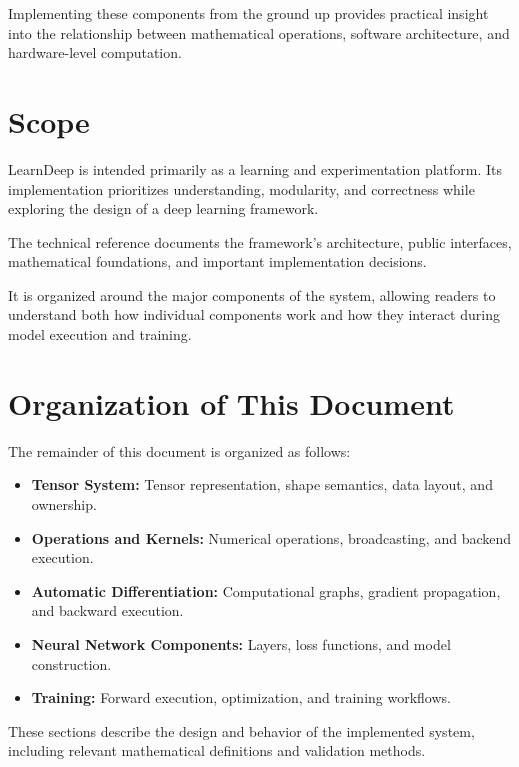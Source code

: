Implementing these components from the ground up
provides practical insight into the relationship
between mathematical operations, software
architecture, and hardware-level computation.

\section{Scope}

LearnDeep is intended primarily as a learning and
experimentation platform. Its implementation
prioritizes understanding, modularity, and correctness
while exploring the design of a deep learning framework.

The technical reference documents the framework's
architecture, public interfaces, mathematical
foundations, and important implementation decisions.

It is organized around the major components of the
system, allowing readers to understand both how
individual components work and how they interact
during model execution and training.

\section{Organization of This Document}

The remainder of this document is organized as follows:

\begin{itemize}
    \item \textbf{Tensor System:} Tensor representation,
          shape semantics, data layout, and ownership.
    \item \textbf{Operations and Kernels:} Numerical
          operations, broadcasting, and backend execution.
    \item \textbf{Automatic Differentiation:}
          Computational graphs, gradient propagation,
          and backward execution.
    \item \textbf{Neural Network Components:} Layers,
          loss functions, and model construction.
    \item \textbf{Training:} Forward execution,
          optimization, and training workflows.
\end{itemize}

These sections describe the design and behavior of
the implemented system, including relevant
mathematical definitions and validation methods.
